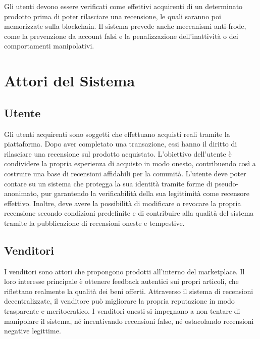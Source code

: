         Gli utenti devono essere verificati come effettivi acquirenti di un determinato prodotto prima di poter rilasciare una recensione, le quali saranno poi memorizzate sulla blockchain.
        Il sistema prevede anche meccanismi anti-frode, come la prevenzione da account falsi e la penalizzazione dell'inattività o dei comportamenti manipolativi.
    
    \section{Attori del Sistema}
        \subsection{Utente}
            Gli utenti acquirenti sono soggetti che effettuano acquisti reali tramite la piattaforma. Dopo aver completato una transazione, essi hanno il diritto di rilasciare una recensione sul prodotto acquistato. L'obiettivo dell'utente è condividere la propria esperienza di acquisto in modo onesto, contribuendo così a costruire una base di recensioni affidabili per la comunità. L'utente deve poter contare su un sistema che protegga la sua identità tramite forme di pseudo-anonimato, pur garantendo la verificabilità della sua legittimità come recensore effettivo. Inoltre, deve avere la possibilità di modificare o revocare la propria recensione secondo condizioni predefinite e di contribuire alla qualità del sistema tramite la pubblicazione di recensioni oneste e tempestive.
        
        \subsection{Venditori}
           I venditori sono attori che propongono prodotti all'interno del marketplace. Il loro interesse principale è ottenere feedback autentici sui propri articoli, che riflettano realmente la qualità dei beni offerti. Attraverso il sistema di recensioni decentralizzate, il venditore può migliorare la propria reputazione in modo trasparente e meritocratico. I venditori onesti si impegnano a non tentare di manipolare il sistema, né incentivando recensioni false, né ostacolando recensioni negative legittime.
            
